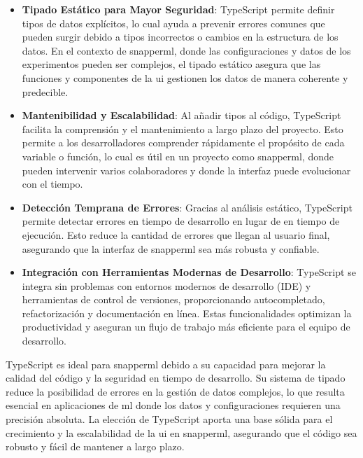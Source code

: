 \begin{itemize}
    \item \textbf{Tipado Estático para Mayor Seguridad}: TypeScript permite definir tipos de datos explícitos, lo cual ayuda a prevenir errores comunes que pueden surgir debido a tipos incorrectos o cambios en la estructura de los datos. En el contexto de \Gls{snapperml}, donde las configuraciones y datos de los experimentos pueden ser complejos, el tipado estático asegura que las funciones y componentes de la \acrshort{ui} gestionen los datos de manera coherente y predecible.
    \item \textbf{Mantenibilidad y Escalabilidad}: Al añadir tipos al código, TypeScript facilita la comprensión y el mantenimiento a largo plazo del proyecto. Esto permite a los desarrolladores comprender rápidamente el propósito de cada variable o función, lo cual es útil en un proyecto como \Gls{snapperml}, donde pueden intervenir varios colaboradores y donde la interfaz puede evolucionar con el tiempo.

    \item \textbf{Detección Temprana de Errores}: Gracias al análisis estático, TypeScript permite detectar errores en tiempo de desarrollo en lugar de en tiempo de ejecución. Esto reduce la cantidad de errores que llegan al usuario final, asegurando que la interfaz de \Gls{snapperml} sea más robusta y confiable.

    \item \textbf{Integración con Herramientas Modernas de Desarrollo}: TypeScript se integra sin problemas con entornos modernos de desarrollo (IDE) y herramientas de control de versiones, proporcionando autocompletado, refactorización y documentación en línea. Estas funcionalidades optimizan la productividad y aseguran un flujo de trabajo más eficiente para el equipo de desarrollo.
\end{itemize}



TypeScript es ideal para \Gls{snapperml} debido a su capacidad para mejorar la calidad del código y la seguridad en tiempo de desarrollo. Su sistema de tipado reduce la posibilidad de errores en la gestión de datos complejos, lo que resulta esencial en aplicaciones de \acrlong{ml} donde los datos y configuraciones requieren una precisión absoluta. La elección de TypeScript aporta una base sólida para el crecimiento y la escalabilidad de la \acrlong{ui} en \Gls{snapperml}, asegurando que el código sea robusto y fácil de mantener a largo plazo.

